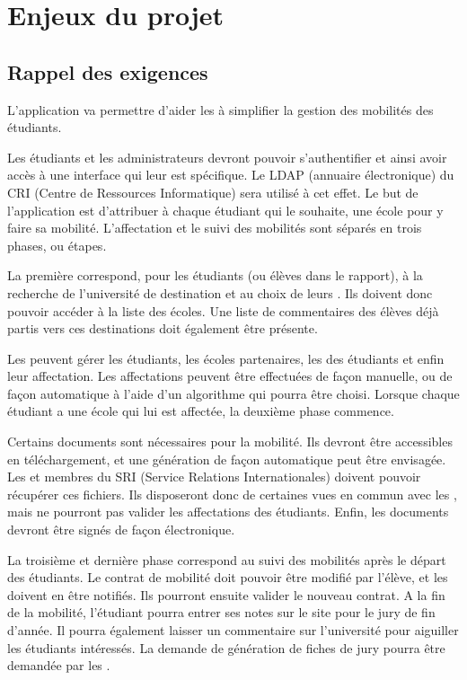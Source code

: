 \chapter{Enjeux du projet}


\section{Rappel des exigences}

L'application va permettre d'aider les \ris à simplifier la gestion des mobilités des étudiants. 

\bigbreak

Les étudiants et les administrateurs devront pouvoir s'authentifier et ainsi avoir accès à une interface qui leur est spécifique. Le LDAP (annuaire électronique) du CRI (Centre de Ressources Informatique) sera utilisé à cet effet. Le but de l'application est d'attribuer à chaque étudiant qui le souhaite, une école pour y faire sa mobilité. L'affectation et le suivi des mobilités sont séparés en trois phases, ou étapes. 


\bigbreak

La première correspond, pour les étudiants (ou élèves dans le rapport), à la recherche de l'université de destination et au choix de leurs \voe. Ils doivent donc pouvoir accéder à la liste des écoles. Une liste de commentaires des élèves déjà partis vers ces destinations doit également être présente.

Les \ris peuvent gérer les étudiants, les écoles partenaires, les \voe des étudiants et enfin leur affectation. Les affectations peuvent être effectuées de façon manuelle, ou de façon automatique à l'aide d'un algorithme qui pourra être choisi. Lorsque chaque étudiant a une école qui lui est affectée, la deuxième phase commence.
\bigbreak

Certains documents sont nécessaires pour la mobilité. Ils devront être accessibles en téléchargement, et une génération de façon automatique peut être envisagée. Les \ris et membres du SRI (Service Relations Internationales) doivent pouvoir récupérer ces fichiers. Ils disposeront donc de certaines vues en commun avec les \ris, mais ne pourront pas valider les affectations des étudiants. Enfin, les documents devront être signés de façon électronique.

\bigbreak

La troisième et dernière phase correspond au suivi des mobilités après le départ des étudiants. Le contrat de mobilité doit pouvoir être modifié par l'élève, et les \ris doivent en être notifiés. Ils pourront ensuite valider le nouveau contrat. A la fin de la mobilité, l'étudiant pourra entrer ses notes sur le site pour le jury de fin d'année. Il pourra également laisser un commentaire sur l'université pour aiguiller les étudiants intéressés. La demande de génération de fiches de jury pourra être demandée par les \ris.
